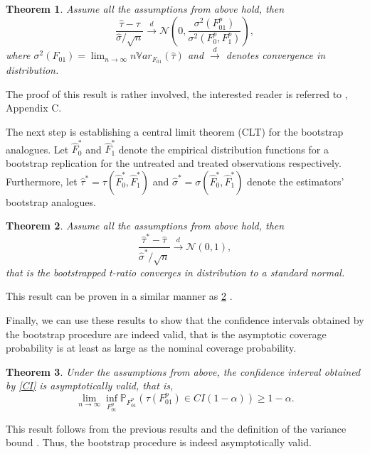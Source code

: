 \documentclass[aodsor,preprint]{imsart}
\numberwithin{equation}{section}
\theoremstyle{plain}
\newtheorem{thm}{Theorem}[section]
\newcommand{\Var}{{\mathbb{V}ar}}
\begin{document}
\begin{thm}
	Assume all the assumptions from above hold, then 
	$$
	\frac{\widehat{\tau} - \tau}{\widehat{\sigma} / \sqrt{n}} \overset{d}{\to} \mathcal{N} \left( 0, \frac{\sigma^2(F_{01}^p)}{\sigma^2(F_0^p, F_1^p)}\right),
	$$
	where $\sigma^2(F_{01}) = \lim_{n \to \infty} n \Var_{F_{01}} (\widehat{\tau})$ and $\overset{d}{\to}$ denotes convergence in distribution.
\end{thm}

The proof of this result is rather involved, the interested reader is referred to \cite{Imbens_2021}, Appendix C.


The next step is establishing a central limit theorem (CLT) for the bootstrap analogues. Let $\widehat{F}_0^*$ and $\widehat{F}_1^*$ denote the empirical distribution functions for a bootstrap replication for the untreated and treated observations respectively. Furthermore, let $\widehat{\tau}^* = \tau(\widehat{F}_0^*, \widehat{F}_1^*)$ and $\widehat{\sigma}^* = \sigma(\widehat{F}_0^*, \widehat{F}_1^*)$ denote the estimators' bootstrap analogues.
		
\begin{thm} \label{Thm3.2}
	Assume all the assumptions from above hold, then
	$$
	\frac{\widehat{\tau}^* - \widehat{\tau}}{\widehat{\sigma}^* / \sqrt{n}} \overset{d}{\to} \mathcal{N} \left( 0, 1 \right),
	$$
	that is the bootstrapped t-ratio converges in distribution to a standard normal.
\end{thm}

This result can be proven in a similar manner as \ref{Thm3.2} \citep[see][section 5 and Appendix C]{Imbens_2021}.

Finally, we can use these results to show that the confidence intervals obtained by the bootstrap procedure are indeed valid, that is the asymptotic coverage probability is at least as large as the nominal coverage probability.

\begin{thm}
	Under the assumptions from above, the confidence interval obtained by \ref{CI} is asymptotically valid, that is,
	$$
	\lim_{n \to \infty} \inf_{F_{01}^p} \mathbb{P}_{F_{01}^p} (\tau(F_{01}^p) \in CI(1-\alpha)) \geq 1 - \alpha.
	$$
\end{thm}

This result follows from the previous results and the definition of the variance bound \citep[see][Corollary 5.1]{Imbens_2021}. Thus, the bootstrap procedure is indeed asymptotically valid.
\end{document}
